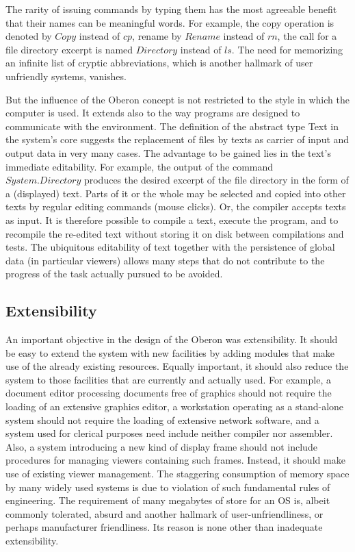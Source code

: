 The rarity of issuing commands by typing them has the most agreeable benefit that their names can
be meaningful words. For example, the copy operation is denoted by $Copy$ instead of $cp$, rename
by $Rename$ instead of $rn$, the call for a file directory excerpt is named $Directory$ instead of $ls$. The
need for memorizing an infinite list of cryptic abbreviations, which is another hallmark of user unfriendly systems, vanishes.

But the influence of the Oberon concept is not restricted to the style in which the computer is used.
It extends also to the way programs are designed to communicate with the environment. The
definition of the abstract type Text in the system's core suggests the replacement of files by texts as
carrier of input and output data in very many cases. The advantage to be gained lies in the text's
immediate editability. For example, the output of the command $System.Directory$ produces the
desired excerpt of the file directory in the form of a (displayed) text. Parts of it or the whole may be
selected and copied into other texts by regular editing commands (mouse clicks). Or, the compiler
accepts texts as input. It is therefore possible to compile a text, execute the program, and to
recompile the re-edited text without storing it on disk between compilations and tests. The
ubiquitous editability of text together with the persistence of global data (in particular viewers)
allows many steps that do not contribute to the progress of the task actually pursued to be avoided.

\subsection{Extensibility}
An important objective in the design of the Oberon was extensibility. It should be easy to
extend the system with new facilities by adding modules that make use of the already existing
resources. Equally important, it should also reduce the system to those facilities that are currently
and actually used. For example, a document editor processing documents free of graphics should
not require the loading of an extensive graphics editor, a workstation operating as a stand-alone
system should not require the loading of extensive network software, and a system used for clerical
purposes need include neither compiler nor assembler. Also, a system introducing a new kind of
display frame should not include procedures for managing viewers containing such frames. Instead,
it should make use of existing viewer management. The staggering consumption of memory space
by many widely used systems is due to violation of such fundamental rules of engineering. The
requirement of many megabytes of store for an OS is, albeit commonly tolerated,
absurd and another hallmark of user-unfriendliness, or perhaps manufacturer friendliness. Its
reason is none other than inadequate extensibility.

